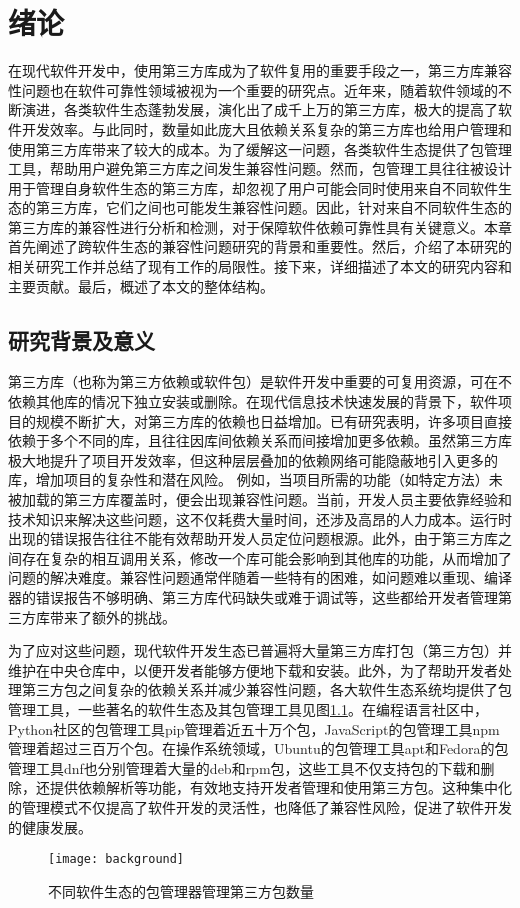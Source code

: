 \chapter{绪论}
在现代软件开发中，使用第三方库成为了软件复用的重要手段之一，第三方库兼容性问题也在软件可靠性领域被视为一个重要的研究点。近年来，随着软件领域的不断演进，各类软件生态蓬勃发展，演化出了成千上万的第三方库，极大的提高了软件开发效率。与此同时，数量如此庞大且依赖关系复杂的第三方库也给用户管理和使用第三方库带来了较大的成本。为了缓解这一问题，各类软件生态提供了包管理工具，帮助用户避免第三方库之间发生兼容性问题。然而，包管理工具往往被设计用于管理自身软件生态的第三方库，却忽视了用户可能会同时使用来自不同软件生态的第三方库，它们之间也可能发生兼容性问题。因此，针对来自不同软件生态的第三方库的兼容性进行分析和检测，对于保障软件依赖可靠性具有关键意义。本章首先阐述了跨软件生态的兼容性问题研究的背景和重要性。然后，介绍了本研究的相关研究工作并总结了现有工作的局限性。接下来，详细描述了本文的研究内容和主要贡献。最后，概述了本文的整体结构。

\section{研究背景及意义}
第三方库（也称为第三方依赖或软件包）是软件开发中重要的可复用资源，可在不依赖其他库的情况下独立安装或删除。在现代信息技术快速发展的背景下，软件项目的规模不断扩大，对第三方库的依赖也日益增加。已有研究表明，许多项目直接依赖于多个不同的库，且往往因库间依赖关系而间接增加更多依赖。虽然第三方库极大地提升了项目开发效率，但这种层层叠加的依赖网络可能隐蔽地引入更多的库，增加项目的复杂性和潜在风险。
例如，当项目所需的功能（如特定方法）未被加载的第三方库覆盖时，便会出现兼容性问题。当前，开发人员主要依靠经验和技术知识来解决这些问题，这不仅耗费大量时间，还涉及高昂的人力成本。运行时出现的错误报告往往不能有效帮助开发人员定位问题根源。此外，由于第三方库之间存在复杂的相互调用关系，修改一个库可能会影响到其他库的功能，从而增加了问题的解决难度。兼容性问题通常伴随着一些特有的困难，如问题难以重现、编译器的错误报告不够明确、第三方库代码缺失或难于调试等，这些都给开发者管理第三方库带来了额外的挑战。

为了应对这些问题，现代软件开发生态已普遍将大量第三方库打包（第三方包）并维护在中央仓库中，以便开发者能够方便地下载和安装。此外，为了帮助开发者处理第三方包之间复杂的依赖关系并减少兼容性问题，各大软件生态系统均提供了包管理工具，一些著名的软件生态及其包管理工具见图\ref{fig:bac}。在编程语言社区中，Python社区的包管理工具pip管理着近五十万个包，JavaScript的包管理工具npm管理着超过三百万个包。在操作系统领域，Ubuntu的包管理工具apt和Fedora的包管理工具dnf也分别管理着大量的deb和rpm包，这些工具不仅支持包的下载和删除，还提供依赖解析等功能，有效地支持开发者管理和使用第三方包。这种集中化的管理模式不仅提高了软件开发的灵活性，也降低了兼容性风险，促进了软件开发的健康发展。
\begin{figure}[htbp]
	\centering
	\texttt{[image: background]}
	\caption{不同软件生态的包管理器管理第三方包数量}
	\label{fig:bac}
\end{figure}

